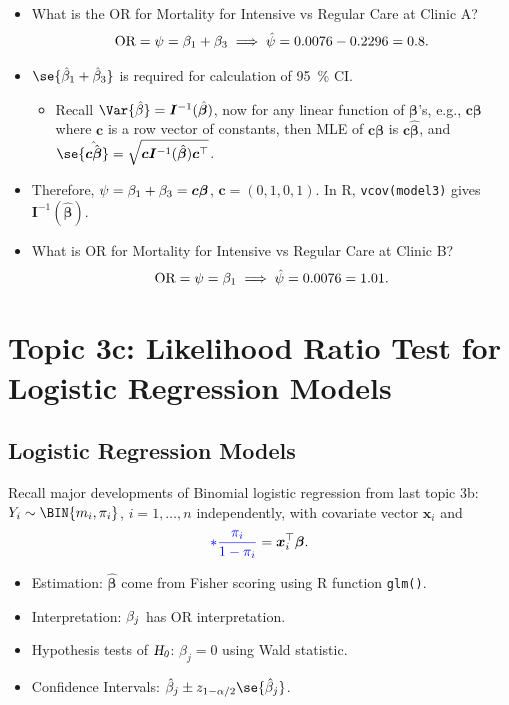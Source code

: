\documentclass[oneside]{book}\usepackage[]{graphicx}\usepackage[svgnames]{xcolor}
\let\exp\relax%
\let\log\relax%
\newcommand{\HN}{\textsl{H}_{\textsl{0}}}%
\newcommand{\OR}{\text{OR}}%
\providecommand{\Vector}[1]{\bm{#1}}%
\providecommand{\Matrix}[1]{\bm{#1}}
\begin{document}
\begin{itemize}
      \item What is the OR for Mortality for Intensive vs Regular Care at Clinic A?
            \[ \OR=\psi=\exp{\beta_1+\beta_3}\implies \hat{\psi}=\exp{0.0076-0.2296}=0.8. \]
      \item $ \se{\hat{\beta}_1+\hat{\beta}_3} $ is required for calculation of \qty{95}{\percent} CI.
            \begin{itemize}
                  \item Recall $ \Var{\hat{\beta}}=\Matrix{I}^{-1}(\hat{\Vector{\beta}}) $, now for any linear function of $ \Vector{\beta} $'s,
                        e.g., $ \Vector{c}\Vector{\beta} $ where $ \Vector{c} $ is a row vector of constants, then MLE of $ \Vector{c}\Vector{\beta} $
                        is $ \Vector{c}\hat{\Vector{\beta}} $, and $ \se{\hat{\Vector{c}\hat{\Vector{\beta}}}}=\sqrt{\Vector{c}\Matrix{I}^{-1}(\hat{\Vector{\beta}})\Vector{c}^\top} $.
            \end{itemize}
      \item Therefore, $ \log{\psi}=\beta_1+\beta_3=\Vector{c}\Vector{\beta} $, $ \Vector{c}=(0,1,0,1) $. In R, \texttt{vcov(model3)}
            gives $ \Matrix{I}^{-1}(\hat{\Vector{\beta}}) $.
      \item What is OR for Mortality for Intensive vs Regular Care at Clinic B?
            \[ \OR=\psi=\exp{\beta_1}\implies \hat{\psi}=\exp{0.0076}=1.01. \]
\end{itemize}

\section*{Topic 3c: Likelihood Ratio Test for Logistic Regression Models}
\subsection*{Logistic Regression Models}
Recall major developments of Binomial logistic regression from last topic 3b: $ Y_i \sim \BIN{m_i,\pi_i} $,
$ i=1,\ldots,n $ independently, with covariate vector $ \Vector{x}_i $ and
\[ \textcolor{Blue}{\log*{\frac{\pi_i}{1-\pi_i}}}=\Vector{x}_i^\top \Vector{\beta}. \]
\begin{itemize}
      \item Estimation: $ \hat{\Vector{\beta}} $ come from Fisher scoring using R function \texttt{glm()}.
      \item Interpretation: $ \exp{\beta_j} $ has $ \OR $ interpretation.
      \item Hypothesis tests of $ \HN $: $ \beta_j=0 $ using Wald statistic.
      \item Confidence Intervals: $ \hat{\beta}_j\pm z_{1-\alpha/2}\se{\hat{\beta}_j} $.
\end{itemize}
\end{document}
